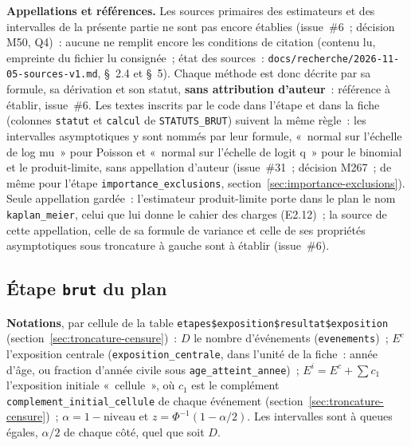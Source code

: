 \documentclass[a4paper,11pt]{article}
\newcommand{\code}[1]{\texttt{\small #1}}
\begin{document}
\begin{encadre}
\small
\textbf{Appellations et références.} Les sources primaires des estimateurs et
des intervalles de la présente partie ne sont pas encore établies
(issue~\#6~; décision M50, Q4)~: aucune ne remplit encore les conditions
de citation (contenu lu, empreinte du fichier lu consignée~; état des
sources~: \code{docs/recherche/}\allowbreak\code{2026-11-05-sources-v1.md},
§~2.4 et §~5). Chaque méthode est donc décrite par sa
formule, sa dérivation et son statut, \textbf{sans attribution d'auteur}~:
référence à établir, issue~\#6. Les textes inscrits par le code dans
l'étape et dans la fiche (colonnes \code{statut} et \code{calcul} de
\code{STATUTS\_BRUT}) suivent la même règle~: les intervalles
asymptotiques y sont nommés par leur formule, «~normal sur l'échelle de
log mu~» pour Poisson et «~normal sur l'échelle de logit q~» pour le
binomial et le produit-limite, sans appellation d'auteur (issue~\#31~;
décision M267~; de même pour l'étape \code{importance\_exclusions},
section~\ref{sec:importance-exclusions}). Seule appellation gardée~:
l'estimateur produit-limite porte dans le plan le nom \code{kaplan\_meier},
celui que lui donne le cahier des charges (E2.12)~; la source de cette
appellation, celle de sa formule de variance et celle de ses propriétés
asymptotiques sous troncature à gauche sont à établir (issue~\#6).
\end{encadre}

\subsection{Étape \code{brut} du plan}
\label{sec:brut-etape}

\textbf{Notations}, par cellule de la table \code{etapes\$exposition\$resultat\$exposition}
(section~\ref{sec:troncature-censure})~: $D$ le nombre d'événements
(\code{evenements})~; $E^c$ l'exposition centrale
(\code{exposition\_centrale}, dans l'unité de la fiche~: année d'âge, ou
fraction d'année civile sous \code{age\_atteint\_annee})~; $E^i = E^c +
\sum c_1$ l'exposition initiale «~cellule~», où $c_1$ est le complément
\code{complement\_initial\_cellule} de chaque événement
(section~\ref{sec:troncature-censure})~; $\alpha = 1 - \text{niveau}$ et
$z = \Phi^{-1}(1 - \alpha/2)$. Les intervalles sont à queues égales,
$\alpha/2$ de chaque côté, quel que soit $D$.
\end{document}
